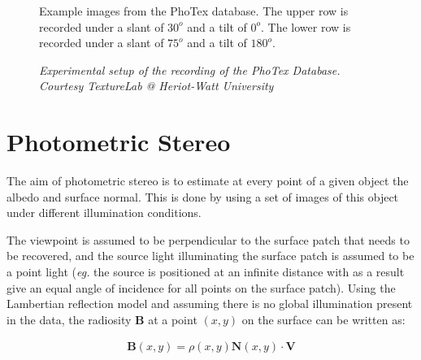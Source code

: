 \begin{figure}[htbp!]
	\begin{center}

	\end{center}
	\caption{Example images from the PhoTex database. The upper row is recorded under a slant of $30^o$ and a tilt of $0^o$. The lower row is recorded under a slant of $75^o$ and a tilt of $180^o$.}
	\label{fig:PhoTexExamples}
\end{figure}


\begin{figure}[htbp!]
	\begin{center}
	\end{center}
	\caption{\textit{Experimental setup of the recording of the PhoTex Database. Courtesy TextureLab @ Heriot-Watt University}}
	\label{fig:PHOTEX_SETUP}
\end{figure}

\section{Photometric Stereo}\label{sec:PhotometricStereo}
The aim of photometric stereo is to estimate at every point of a given object the albedo and surface normal. This is done by using a set of images of this object under different illumination conditions. 

The viewpoint is assumed to be perpendicular to the surface patch that needs to be recovered, and the source light illuminating the surface patch is assumed to be a point light (\textit{eg.} the source is positioned at an infinite distance with as a result give an equal angle of incidence for all points on the surface patch). Using the Lambertian reflection model and assuming there is no global illumination present in the data, the radiosity \textbf{B} at a point $(x, y)$ on the surface can be written as:

	\begin{eqnarray*}
		\textbf{B}(x,y) = \rho(x,y)\textbf{N}(x,y) \cdot \textbf{V}
	\end{eqnarray*}

